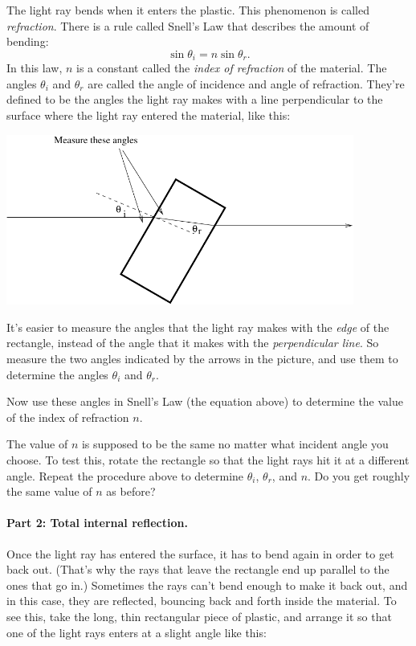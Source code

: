 The light ray bends when it enters the plastic.  This phenomenon is
called {\it refraction}.  There is a rule called Snell's Law that
describes the amount of bending:
$$
\sin\theta_i=n\sin\theta_r.
$$
In this law, $n$ is a constant called the {\it index of refraction} of 
the material.  The angles $\theta_i$ and $\theta_r$ are called the
angle of incidence and angle of refraction.  They're defined to be the
angles the light ray makes with a line perpendicular to the surface
where the light ray entered the material, like this:

\answerspace{0.1in}
\centerline{\includegraphics[width=4.5in]{lenses1/lensfig3.pdf}}

It's easier to measure the angles that the light ray makes with
the \textit{edge} of the rectangle, instead of the angle that it makes with
the \textit{perpendicular line}.  So measure the two angles
indicated by the arrows in the picture, and use them
to determine the angles $\theta_i$ and $\theta_r$.

\answerspace{1.5in}

Now use these angles in Snell's Law (the equation above) to determine
the value of the index of refraction $n$.

\answerspace{1.5in}

The value of $n$ is supposed to be the same no matter what incident angle
you choose.  To test this, rotate the rectangle so that the light
rays hit it at a different angle.  Repeat the procedure above to determine
$\theta_i$, $\theta_r$, and $n$.  Do you get roughly the same value of $n$ as
before?

\answerspace{3.0in}

\paragraph{Part 2: Total internal reflection.}
Once the light ray has entered the surface, it has to bend again
in order to get back out.  (That's why the rays that leave the rectangle
end up parallel to the ones that go in.)  Sometimes the rays can't bend
enough to make it back out, and in this case, they are reflected, bouncing
back and forth inside the material.  To see this, take the long, thin
rectangular piece of plastic, and arrange it so that one of the light
rays enters at a slight angle like this:


